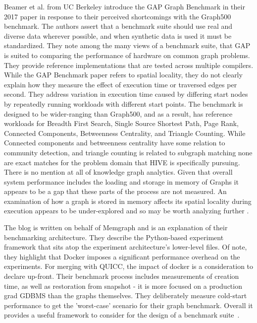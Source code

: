 \par{Beamer et al. from UC Berkeley introduce the GAP Graph Benchmark in their 2017 paper in response to their perceived shortcomings with the Graph500 benchmark. 
The authors assert that a benchmark suite should use real and diverse data wherever possible, and when synthetic data is used it must be standardized. 
They note among the many views of a benchmark suite, that GAP is suited to comparing the performance of hardware on common graph problems.
They provide reference implementations that are tested across multiple compilers. 
While the GAP Benchmark paper refers to spatial locality, they do not clearly explain how they measure the effect of execution time or traversed edges per second. 
They address variation in execution time caused by differing start nodes by repeatedly running workloads with different start points. 
The benchmark is designed to be wider-ranging than Graph500, and as a result, has reference workloads for Breadth First Search, Single Source Shortest Path, Page Rank, Connected Components, Betweenness Centrality, and Triangle Counting. 
While Connected components and betweenness centrality have some relation to community detection, and triangle counting is related to subgraph matching none are exact matches for the problem domain that HIVE is specifically pursuing. 
There is no mention at all of knowledge graph analytics. Given that overall system performance includes the loading and storage in memory of Graphs it appears to be a gap that these parts of the process are not measured. 
An examination of how a graph is stored in memory affects its spatial locality during execution appears to be under-explored and so may be worth analyzing further \cite{Beamer2017}.}

\par{The blog is written on behalf of Memgraph and is an explanation of their benchmarking architecture. 
They describe the Python-based experiment framework that sits atop the experiment architecture's lower-level files. 
Of note, they highlight that Docker imposes a significant performance overhead on the experiments. 
For merging with QUICC, the impact of docker is a consideration to declare up-front. 
Their benchmark process includes measurements of creation time, as well as restoration from snapshot - it is more focused on a production grad GDBMS than the graphs themselves. 
They deliberately measure cold-start performance to get the 'worst-case' scenario for their graph benchmark. 
Overall it provides a useful framework to consider for the design of a benchmark suite~\cite{Javor2022}.}

